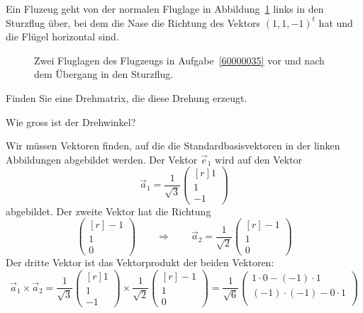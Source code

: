 Ein Fluzeug geht von der normalen Fluglage in Abbildung~\ref{60000035:fig}
links in den Sturzflug über, bei dem die Nase die Richtung des Vektors
$(1,1,-1)^t$ hat und die Flügel horizontal sind.
\begin{figure}[h]
\centering
{}
\caption{
Zwei Fluglagen des Flugzeugs in Aufgabe~\ref{60000035}
vor und nach dem Übergang in den Sturzflug.
\label{60000035:fig}}
\end{figure}
\begin{teilaufgaben}
\item Finden Sie eine Drehmatrix, die diese Drehung erzeugt.
\item Wie gross ist der Drehwinkel?
\end{teilaufgaben}

\begin{loesung}
\begin{teilaufgaben}
\item
Wir müssen Vektoren finden, auf die die Standardbasisvektoren in der 
linken Abbildungen abgebildet werden.
Der Vektor $\vec{e}_1$ wird auf den Vektor
\[
\vec{a}_1
=
\frac{1}{\sqrt{3}}\begin{pmatrix*}[r] 1\\1\\-1\end{pmatrix*}
\]
abgebildet.
Der zweite Vektor hat die Richtung
\[
\begin{pmatrix*}[r]-1\\1\\0\end{pmatrix*}
\qquad\Rightarrow\qquad
\vec{a}_2
=
\frac{1}{\sqrt{2}}
\begin{pmatrix*}[r]-1\\1\\0\end{pmatrix*}
\]
Der dritte Vektor ist das Vektorprodukt der beiden Vektoren:
\[
\vec{a}_1\times \vec{a}_2
=
\frac{1}{\sqrt{3}}
\begin{pmatrix*}[r] 1\\1\\-1\end{pmatrix*}
\times
\frac{1}{\sqrt{2}}
\begin{pmatrix*}[r]-1\\1\\0\end{pmatrix*}
=
\frac{1}{\sqrt{6}}
\begin{pmatrix}
1\cdot 0-(-1)\cdot 1\\
(-1)\cdot(-1)-0\cdot 1\\

\end{pmatrix}\]
\end{teilaufgaben}
\end{loesung}
